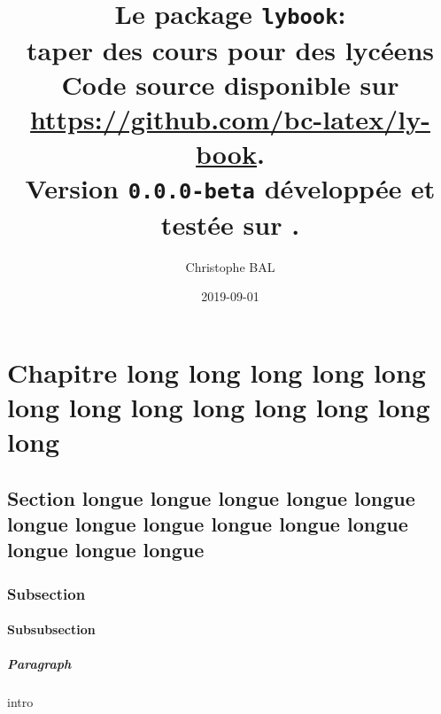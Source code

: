 \documentclass[14pt]{memoir}
\begin{document}
\frontmatter

\title{%
	Le package \texttt{lybook}:\\%
	taper des cours pour des lycéens\\%
	{\footnotesize Code source disponible sur \url{https://github.com/bc-latex/ly-book}.}\\%
{\footnotesize Version \texttt{0.0.0-beta} développée et testée sur \macosxname{}.}%
}
\author{Christophe BAL}
\date{2019-09-01}

\maketitle



\begin{KeepFromToc}
   \tableofcontents
\end{KeepFromToc}


\mainmatter


\chapter{Chapitre long long long long long long long long long long long long long}

\section{Section longue longue longue longue longue longue longue longue longue longue longue longue longue longue}

\subsection{Subsection}

\subsubsection{Subsubsection}

\paragraph{Paragraph}

{intro}
\end{document}
